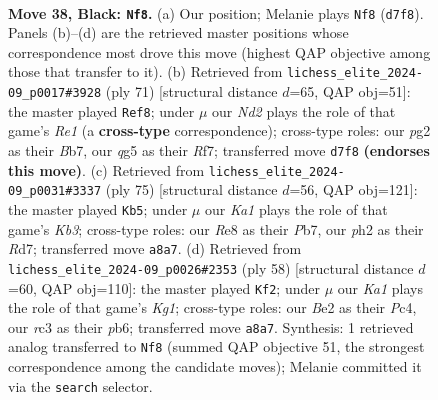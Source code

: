 \documentclass[11pt]{article}
\begin{document}
\clearpage

\begin{figure}[p]\centering
\begin{subfigure}{0.46\textwidth}\centering
\resizebox{\linewidth}{!}{%
\newchessgame
\chessboard[
  setfen={k3r3/1p1n4/1r1p4/3Rp1Q1/4P3/1PR2P2/K3b1PP/8 b - - 1 38},
  showmover=false,
  pgfstyle=straightmove, color=movearrow, markmove={d7-f8}
]}
\caption{}
\end{subfigure}\hfill
\begin{subfigure}{0.46\textwidth}\centering
\resizebox{\linewidth}{!}{%
\newchessgame
\chessboard[
  setfen={4r3/1b3rpk/3R3p/2P5/4p1P1/1PB1R2P/5P2/6K1 b - - 0 36},
  showmover=false,
  pgfstyle=straightmove, color=movearrow, markmove={e8-f8}
]}
\caption{}
\end{subfigure}
\\[4pt]
\begin{subfigure}{0.46\textwidth}\centering
\resizebox{\linewidth}{!}{%
\newchessgame
\chessboard[
  setfen={8/1prr2p1/1k3pR1/4pN1P/8/1P1n2P1/P3RPK1/8 b - - 10 38},
  showmover=false,
  pgfstyle=straightmove, color=movearrow, markmove={b6-b5}
]}
\caption{}
\end{subfigure}\hfill
\begin{subfigure}{0.46\textwidth}\centering
\resizebox{\linewidth}{!}{%
\newchessgame
\chessboard[
  setfen={6k1/p1p4p/1p1p3r/3Pr1p1/2P1P3/2P3R1/P5P1/4R1K1 w - - 0 30},
  showmover=false,
  pgfstyle=straightmove, color=movearrow, markmove={g1-f2}
]}
\caption{}
\end{subfigure}
\caption{\textbf{Move 38, Black: \texttt{Nf8}.} (a) Our position; Melanie plays \texttt{Nf8} (\texttt{d7f8}). Panels (b)--(d) are the retrieved master positions whose correspondence most drove this move (highest QAP objective among those that transfer to it). (b) Retrieved from \texttt{lichess\_elite\_2024-09\_p0017\#3928} (ply 71) [structural distance $d$=65, QAP obj=51]: the master played \texttt{Ref8}; under $\mu$ our \emph{Nd2} plays the role of that game's \emph{Re1} (a \textbf{cross-type} correspondence); cross-type roles: our \emph{p}g2 as their \emph{B}b7, our \emph{q}g5 as their \emph{R}f7; transferred move \texttt{d7f8} \textbf{(endorses this move)}. (c) Retrieved from \texttt{lichess\_elite\_2024-09\_p0031\#3337} (ply 75) [structural distance $d$=56, QAP obj=121]: the master played \texttt{Kb5}; under $\mu$ our \emph{Ka1} plays the role of that game's \emph{Kb3}; cross-type roles: our \emph{R}e8 as their \emph{P}b7, our \emph{p}h2 as their \emph{R}d7; transferred move \texttt{a8a7}. (d) Retrieved from \texttt{lichess\_elite\_2024-09\_p0026\#2353} (ply 58) [structural distance $d$=60, QAP obj=110]: the master played \texttt{Kf2}; under $\mu$ our \emph{Ka1} plays the role of that game's \emph{Kg1}; cross-type roles: our \emph{B}e2 as their \emph{P}c4, our \emph{r}c3 as their \emph{p}b6; transferred move \texttt{a8a7}. Synthesis: 1 retrieved analog transferred to \texttt{Nf8} (summed QAP objective 51, the strongest correspondence among the candidate moves); Melanie committed it via the \texttt{search} selector.}
\label{fig:thought-m75}
\end{figure}
\end{document}
